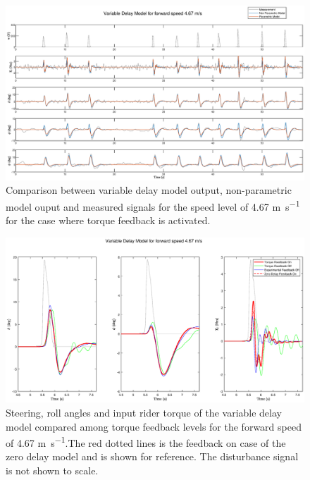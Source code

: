\begin{figure}[!h]
    \centering
    \captionsetup{justification=centering,margin=2cm}

    \includegraphics[width=\textwidth]{images/predict_delay_result1.eps}
    \caption{Comparison between variable delay model output, non-parametric model ouput and measured signals for the speed level of 4.67 \si{\meter\per\second} for the case where torque feedback is activated.}
    \label{fig:paper9}
\end{figure}


\begin{figure}[!h]
    \centering
    \captionsetup{justification=centering,margin=2cm}

    \includegraphics[width=\textwidth]{images/predict_delay_compare2.eps}
    \caption{Steering, roll angles and input rider torque of the variable delay model  compared among torque feedback levels  for the forward speed of 4.67 \si{\meter\per\second}.The red dotted lines is the feedback on case of the zero delay model and is shown for reference. The disturbance signal is not shown  to scale.}
    \label{fig:paper10}
\end{figure}

